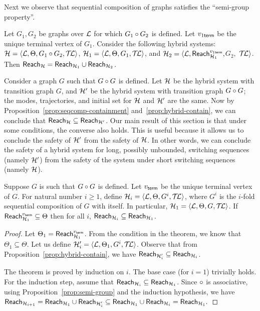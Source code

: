 Next we observe that sequential composition of graphs satisfies the
``semi-group property''.
\begin{proposition}
\label{prop:semi-group}
Let $G_1,G_2$ be graphs over ${\mathcal L}$ for which $G_1\circ G_2$ is
defined. Let $v_{1 {\sf term}}$ be the unique terminal vertex of
$G_1$. Consider the following hybrid systems: ${\mathcal H} = \langle {\mathcal L},
\Theta, G_1\circ G_2, \mathcal{T\mkern-3mu L}\rangle$, ${\mathcal H}_1 = \langle{\mathcal L}, \Theta, G_1,
\mathcal{T\mkern-3mu L}\rangle$, and $\H_2 = \langle\L, \reach{\H_1}^{v_{1 {\sf term}}}, $$
G_2,$ $ \mathcal{T\mkern-3mu L}\rangle$. Then
$\reach{\H} = \reach{\H_1} \cup \reach{\H_2}$.
\end{proposition}

Consider a graph $G$ such that $G\circ G$ is defined. Let ${\mathcal H}$ be
the hybrid system with transition graph $G$, and ${\mathcal H}'$ be the hybrid
system with transition graph $G\circ G$; the modes, trajectories,
and initial set for ${\mathcal H}$ and ${\mathcal H}'$ are the same. Now by
Proposition~\ref{prop:seqcomp-containment}
and~\ref{prop:hybrid-contain}, we can conclude that $\reach{\H}
\subseteq \reach{\H'}$. Our main result of this section is that under
some conditions, the converse also holds. This is useful because it
allows us to conclude the safety of ${\mathcal H}'$ from the safety of ${\mathcal H}$. In
other words, we can conclude the safety of a hybrid system for long, possibly unbounded, switching sequences (namely ${\mathcal H}'$) from the safety of the system under short switching sequences (namely ${\mathcal H}$).
\begin{theorem}
\label{thm:seqcomp-mainresult}
Suppose $G$ is such that $G\circ G$ is defined. Let $v_{{\sf
    term}}$ be the unique terminal vertex of $G$. For natural number
$i \geq 1$, define ${\mathcal H}_i = \langle {\mathcal L}, \Theta, G^i, \mathcal{T\mkern-3mu L}\rangle$, where
$G^i$ is the $i$-fold sequential composition of $G$ with itself. In
particular, ${\mathcal H}_1 = \langle {\mathcal L}, \Theta, G, \mathcal{T\mkern-3mu L}\rangle$. If
$
\reach{\H_1}^{v_{{\sf term}}} \subseteq \Theta
$
then for all $i$, $\reach{\H_i} \subseteq \reach{\H_1}$.
\end{theorem}

\begin{proof}
Let $\Theta_1 = \reach{\H_1}^{v_{{\sf term}}}$. From the condition in
the theorem, we know that $\Theta_1 \subseteq \Theta$. Let us define
${\mathcal H}_i' = \langle {\mathcal L}, \Theta_1, G^i, \mathcal{T\mkern-3mu L}\rangle$. Observe that from
Proposition~\ref{prop:hybrid-contain}, we have $\reach{\H_i'} \subseteq
\reach{\H_i}$.

The theorem is proved by induction on $i$. The base case (for $i = 1$)
trivially holds. For the induction step, assume that $\reach{\H_i}
\subseteq \reach{\H_1}$. Since $\circ$ is associative, using
Proposition~\ref{prop:semi-group} and the induction hypothesis, we
have
$
\reach{\H_{i+1}} = \reach{\H_1} \cup \reach{\H_i'} \subseteq
    \reach{\H_1} \cup \reach{\H_i} = \reach{\H_1}.
$
\end{proof}

